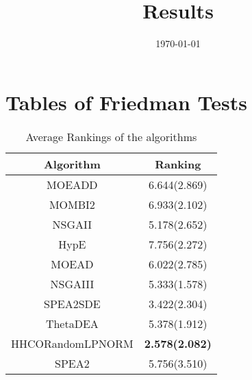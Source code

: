 \documentclass{article}
\title{Results}
\author{}
\date{\today}
\begin{document}
\oddsidemargin 0in \topmargin 0in\maketitle
\section{Tables of Friedman Tests}
\begin{table}[!htp]
\centering
\caption{Average Rankings of the algorithms
}\begin{tabular}{|c|c|}
\hline
Algorithm&Ranking\\
\hline
MOEADD&6.644(2.869)\\\hline
MOMBI2&6.933(2.102)\\\hline
NSGAII&5.178(2.652)\\\hline
HypE&7.756(2.272)\\\hline
MOEAD&6.022(2.785)\\\hline
NSGAIII&5.333(1.578)\\\hline
SPEA2SDE&3.422(2.304)\\\hline
ThetaDEA&5.378(1.912)\\\hline
HHCORandomLPNORM& {\bf 2.578(2.082)}\\\hline
SPEA2&5.756(3.510)\\\hline
\end{tabular}
\end{table}
\end{document}
